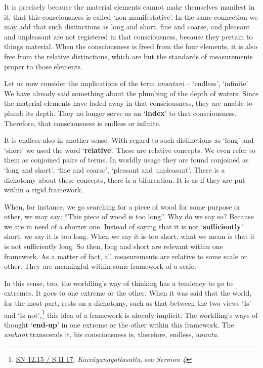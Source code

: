 It is precisely because the material elements cannot make themselves manifest in it, that this consciousness is called `non-manifestative'. In the same connection we may add that such distinctions as long and short, fine and coarse, and pleasant and unpleasant are not registered in that consciousness, because they pertain to things material. When the consciousness is freed from the four elements, it is also free from the relative distinctions, which are but the standards of measurements proper to those elements.

Let us now consider the implications of the term \emph{anantaṁ} -- `endless', `infinite'. We have already said something about the plumbing of the depth of waters. Since the material elements have faded away in that consciousness, they are unable to plumb its depth. They no longer serve as an `\textbf{index}' to that consciousness. Therefore, that consciousness is endless or infinite.

It is endless also in another sense. With regard to such distinctions as `long' and `short' we used the word `\textbf{relative}'. These are relative concepts. We even refer to them as conjoined pairs of terms. In worldly usage they are found conjoined as `long and short', `fine and coarse', `pleasant and unpleasant'. There is a dichotomy about these concepts, there is a bifurcation. It is as if they are put within a rigid framework.

When, for instance, we go searching for a piece of wood for some purpose or other, we may say: ``This piece of wood is too long''. Why do we say so? Because we are in need of a shorter one. Instead of saying that it is not `\textbf{sufficiently}' short, we say it is too long. When we say it is too short, what we mean is that it is not sufficiently long. So then, long and short are relevant within one framework. As a matter of fact, all measurements are relative to some scale or other. They are meaningful within some framework of a scale.

In this sense, too, the worldling's way of thinking has a tendency to go to extremes. It goes to one extreme or the other. When it was said that the world, for the most part, rests on a dichotomy, such as that between the two views `Is' and `Is not',\footnote{\href{https://suttacentral.net/sn12.15/pli/ms}{SN 12.15 / S II 17}, \emph{Kaccāyanagottasutta}, see \emph{Sermon 4}} this idea of a framework is already implicit. The worldling's ways of thought `\textbf{end-up}' in one extreme or the other within this framework. The \emph{arahant} transcends it, his consciousness is, therefore, endless, \emph{ananta}.

